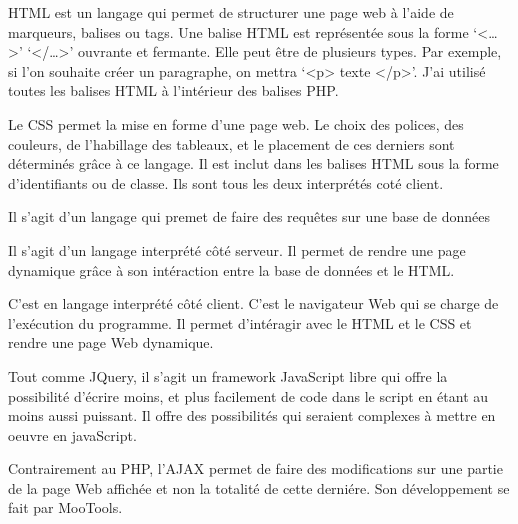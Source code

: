 

		HTML est un langage qui permet de structurer une page web à l’aide de marqueurs, balises ou tags. Une balise HTML est représentée sous la forme ‘<\ldots>’  ‘</\ldots>’ ouvrante et fermante. Elle peut être de plusieurs types. Par exemple, si l’on souhaite créer un paragraphe, on mettra ‘<p> texte </p>’. J’ai utilisé toutes les balises HTML à l’intérieur des balises PHP.

		Le CSS permet la mise en forme d’une page web. Le choix des polices, des couleurs, de l’habillage des tableaux, et le placement de ces derniers sont déterminés grâce à ce langage. Il est inclut dans les balises HTML sous la forme d’identifiants ou de classe. Ils sont tous les deux interprétés coté client.

		Il s'agit d'un langage qui premet de faire des requêtes sur une base de données

		Il s'agit d'un langage interprété côté serveur. Il permet de rendre une page dynamique grâce à son intéraction entre la base de données et le HTML.\\
		\mybox{
			
			}


		C'est en langage interprété côté client. C'est le navigateur Web qui se charge de l'exécution du programme. Il permet d'intéragir avec le HTML et le CSS et rendre une page Web dynamique.\\

		\mybox{
			
			}


		Tout comme JQuery, il s'agit un framework JavaScript libre qui offre la possibilité d'écrire moins, et plus facilement de code dans le script en étant au moins aussi puissant. Il offre des possibilités qui seraient complexes à mettre en oeuvre en javaScript.
		\mybox{
			
			}
	

		Contrairement au PHP, l'AJAX permet de faire des modifications sur une partie de la page Web affichée et non la totalité de cette derniére. Son développement se fait par MooTools.


% 
%

